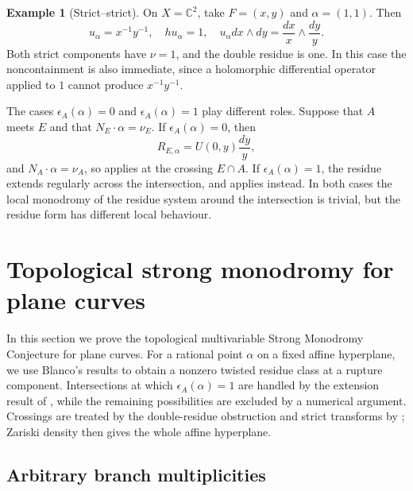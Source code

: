 \documentclass[12pt]{amsart}
\numberwithin{equation}{section}
\theoremstyle{plain}
\theoremstyle{definition}
\newtheorem{example}[theorem]{Example}
\theoremstyle{remark}
\theoremstyle{definition}
\newcommand{\C}{\mathbb C}
\begin{document}
\begin{example}[Strict--strict]\label{ex:double-strict-strict}
On $X=\C^2$, take $F=(x,y)$ and $\alpha=(1,1)$. Then
\begin{equation*}
u_\alpha=x^{-1}y^{-1},\quad hu_\alpha=1,\quad u_\alpha dx\wedge dy=\frac{dx}{x}\wedge\frac{dy}{y}.
\end{equation*}
Both strict components have $\nu=1$, and the double residue is one. In this case the noncontainment is also immediate, since a holomorphic differential operator applied to $1$ cannot produce $x^{-1}y^{-1}$.
\end{example}

The cases $\epsilon_A(\alpha)=0$ and $\epsilon_A(\alpha)=1$ play different roles. Suppose that $A$ meets $E$ and that $N_E\cdot\alpha=\nu_E$. If $\epsilon_A(\alpha)=0$, then
\begin{equation*}
R_{E,\alpha}=U(0,y)\frac{dy}{y},
\end{equation*}
and $N_A\cdot\alpha=\nu_A$, so  applies at the crossing $E\cap A$. If $\epsilon_A(\alpha)=1$, the residue extends regularly across the intersection, and  applies instead. In both cases the local monodromy of the residue system around the intersection is trivial, but the residue form has different local behaviour.






\section{Topological strong monodromy for plane curves} \label{sec:main-theorem}

In this section we prove the topological multivariable Strong Monodromy Conjecture for plane curves. For a rational point $\alpha$ on a fixed affine hyperplane, we use Blanco's results to obtain a nonzero twisted residue class at a rupture component. Intersections at which $\epsilon_A(\alpha)=1$ are handled by the extension result of , while the remaining possibilities are excluded by a numerical argument. Crossings are treated by the double-residue obstruction and strict transforms by ; Zariski density then gives the whole affine hyperplane.

\subsection{Arbitrary branch multiplicities}
\end{document}
